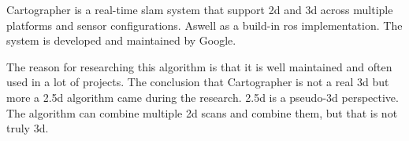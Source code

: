 Cartographer is a real\hyp{}time \acs{slam} system that support \acs{2d} and \acs{3d} across multiple platforms and sensor configurations. Aswell as a build\hyp{}in \acs{ros} implementation. The system is developed and maintained by Google. \cite{cartographer_ros_integration}

The reason for researching this algorithm is that it is well maintained and often used in a lot of projects. The conclusion that Cartographer is not a real \acs{3d} but more a \acs{2.5d} algorithm came during the research. \acs{2.5d} is a pseudo\hyp{}\acs{3d} perspective. The algorithm can combine multiple \acs{2d} scans and combine them, but that is not truly \acs{3d}. \cite{liang2016generating}